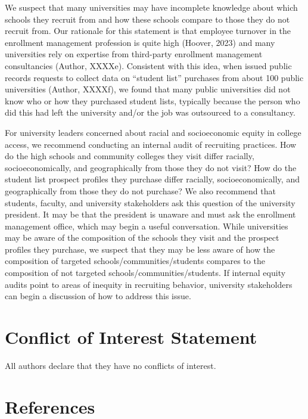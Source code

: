 \documentclass[
  12pt,
]{article}
\begin{document}
We suspect that many universities may have incomplete knowledge about which schools they recruit from and how these schools compare to those they do not recruit from. Our rationale for this statement is that employee turnover in the enrollment management profession is quite high (Hoover, 2023) and many universities rely on expertise from third-party enrollment management consultancies (Author, XXXXe). Consistent with this idea, when issued public records requests to collect data on ``student list'' purchases from about 100 public universities (Author, XXXXf), we found that many public universities did not know who or how they purchased student lists, typically because the person who did this had left the university and/or the job was outsourced to a consultancy.

For university leaders concerned about racial and socioeconomic equity in college access, we recommend conducting an internal audit of recruiting practices. How do the high schools and community colleges they visit differ racially, socioeconomically, and geographically from those they do not visit? How do the student list prospect profiles they purchase differ racially, socioeconomically, and geographically from those they do not purchase? We also recommend that students, faculty, and university stakeholders ask this question of the university president. It may be that the president is unaware and must ask the enrollment management office, which may begin a useful conversation. While universities may be aware of the composition of the schools they visit and the prospect profiles they purchase, we suspect that they may be less aware of how the composition of targeted schools/communities/students compares to the composition of not targeted schools/communities/students. If internal equity audits point to areas of inequity in recruiting behavior, university stakeholders can begin a discussion of how to address this issue.

\hypertarget{conflict-of-interest-statement}{%
\section{Conflict of Interest Statement}\label{conflict-of-interest-statement}}

All authors declare that they have no conflicts of interest.

\singlespacing

\hypertarget{references}{%
\section{References}\label{references}}
\end{document}
